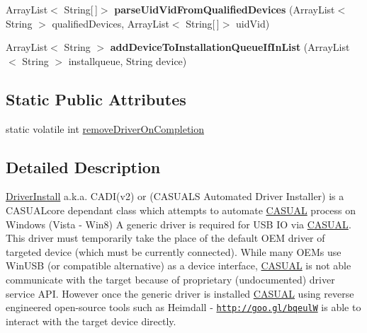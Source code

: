 \begin{DoxyCompactItemize}
\item 
\hypertarget{class_c_a_s_u_a_l_1_1communicationstools_1_1heimdall_1_1drivers_1_1_driver_install_a18f48b07185e6c00735b8475f2915804}{Array\-List$<$ String\mbox{[}$\,$\mbox{]}$>$ {\bfseries parse\-Uid\-Vid\-From\-Qualified\-Devices} (Array\-List$<$ String $>$ qualified\-Devices, Array\-List$<$ String\mbox{[}$\,$\mbox{]}$>$ uid\-Vid)}\label{class_c_a_s_u_a_l_1_1communicationstools_1_1heimdall_1_1drivers_1_1_driver_install_a18f48b07185e6c00735b8475f2915804}

\item 
\hypertarget{class_c_a_s_u_a_l_1_1communicationstools_1_1heimdall_1_1drivers_1_1_driver_install_a0e507190d24893459acf15fa40d59d65}{Array\-List$<$ String $>$ {\bfseries add\-Device\-To\-Installation\-Queue\-If\-In\-List} (Array\-List$<$ String $>$ installqueue, String device)}\label{class_c_a_s_u_a_l_1_1communicationstools_1_1heimdall_1_1drivers_1_1_driver_install_a0e507190d24893459acf15fa40d59d65}

\end{DoxyCompactItemize}
\subsection*{Static Public Attributes}
\begin{DoxyCompactItemize}
\item 
static volatile int \hyperlink{class_c_a_s_u_a_l_1_1communicationstools_1_1heimdall_1_1drivers_1_1_driver_install_a12318e9687dad09e3f4978e7befd789b}{remove\-Driver\-On\-Completion}
\end{DoxyCompactItemize}


\subsection{Detailed Description}


 \hyperlink{class_c_a_s_u_a_l_1_1communicationstools_1_1heimdall_1_1drivers_1_1_driver_install}{Driver\-Install} a.\-k.\-a. C\-A\-D\-I(v2) or (C\-A\-S\-U\-A\-L\-S Automated Driver Installer) is a C\-A\-S\-U\-A\-Lcore dependant class which attempts to automate \hyperlink{namespace_c_a_s_u_a_l}{C\-A\-S\-U\-A\-L} process on Windows (Vista -\/ Win8) A generic driver is required for U\-S\-B I\-O via \hyperlink{namespace_c_a_s_u_a_l}{C\-A\-S\-U\-A\-L}. This driver must temporarily take the place of the default O\-E\-M driver of targeted device (which must be currently connected). While many O\-E\-Ms use Win\-U\-S\-B (or compatible alternative) as a device interface, \hyperlink{namespace_c_a_s_u_a_l}{C\-A\-S\-U\-A\-L} is not able communicate with the target because of proprietary (undocumented) driver service A\-P\-I. However once the generic driver is installed \hyperlink{namespace_c_a_s_u_a_l}{C\-A\-S\-U\-A\-L} using reverse engineered open-\/source tools such as Heimdall -\/ \href{http://goo.gl/bqeulW}{\tt http\-://goo.\-gl/bqeul\-W} is able to interact with the target device directly.

